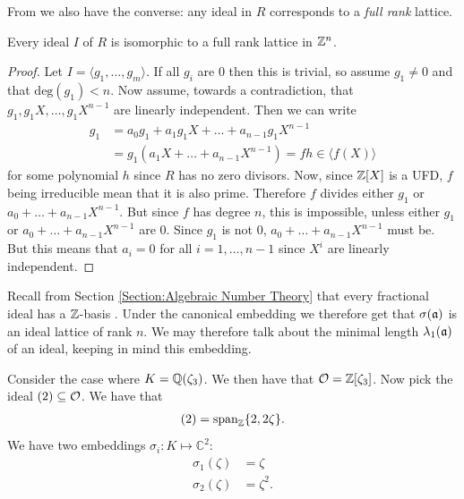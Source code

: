     From \cite{Ideal Lattice Proof} we also have the converse: any ideal in \(R\) corresponds to a \emph{full rank} lattice.
    \begin{proposition}
        Every ideal \(I\) of \(R\) is isomorphic to a full rank lattice in \(\mathbb{Z}^n\).
    \end{proposition}
    \begin{proof}
        Let \(I = \langle g_1,\dots ,g_m\rangle\). If all \(g_i\) are 0 then this is trivial, so assume \(g_1\not = 0\) and that \(\text{deg}(g_1) < n\). Now assume, towards a contradiction, that \(g_1, g_1X,\dots ,g_1X^{n-1}\) are linearly independent. Then we can write
        \begin{equation*}
            \begin{split}
            g_1 & =  a_0g_1 + a_1g_1X + \dots + a_{n-1}g_1X^{n-1} \\
                & =  g_1(a_1X + \dots + a_{n-1}X^{n-1}) =  fh \in \langle f(X)\rangle 
            \end{split}
        \end{equation*}
        for some polynomial \(h\) since \(R\) has no zero divisors. Now, since \(\mathbb{Z}[X]\) is a UFD, \(f\) being irreducible mean that it is also prime. Therefore \(f\) divides either \(g_1\) or \(a_0 + \dots + a_{n-1}X^{n-1}\). But since \(f\) has degree \(n\), this is impossible, unless either \(g_1\) or \(a_0 + \dots + a_{n-1}X^{n-1}\) are 0. Since \(g_1\) is not 0, \(a_0 + \dots + a_{n-1}X^{n-1}\) must be. But this means that \(a_i = 0\) for all \( i = 1,\dots , n-1\) since \(X^i\) are linearly independent.  
    \end{proof}
    Recall from Section \ref{Section:Algebraic Number Theory} that every fractional ideal has a \(\mathbb{Z}\)-basis . Under the canonical embedding we therefore get that \(\sigma(\mathfrak{a})\) is an ideal lattice of rank \(n\). We may therefore talk about the minimal length \(\lambda_1(\mathfrak{a})\) of an ideal, keeping in mind this embedding.\par
    
    Consider the case where \(K = \mathbb{Q}(\zeta_3)\). We then have that \(\mathcal{O} = \mathbb{Z}[\zeta_3]\). Now pick the ideal \((2)\subseteq \mathcal{O}\). We have that
    \begin{align*}
        (2) = \text{span}_{\mathbb{Z}}\{2, 2\zeta\}.
    \end{align*}
    We have two embeddings \(\sigma_i:K\mapsto \mathbb{C}^2\):
    \begin{equation}
        \begin{split}
            \sigma_1(\zeta) & = \zeta\\
            \sigma_2(\zeta) & = \zeta^2.
        \end{split}
    \end{equation}
    
